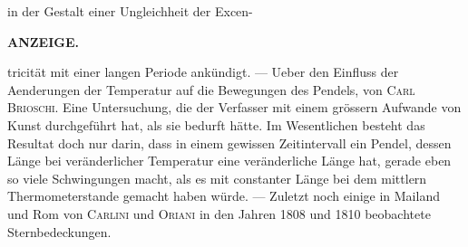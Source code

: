 in der Gestalt einer Ungleichheit der Excen-\par
{}
\clearpage
\thispagestyle{empty}
\noindent{}%
%
\parbox[t]{\dimexpr\linewidth-24mm\relax}{\centering\footnotesize\bfseries ANZEIGE.\par}%
\makebox[12mm][r]{}\par\nobreak\medskip
\noindent tricität mit einer langen Periode ankündigt. --- Ueber den Einfluss der Aenderungen der Temperatur auf die Bewegungen des Pendels, von \textsc{Carl Brioschi}. Eine Untersuchung, die der Verfasser mit einem grössern Aufwande von Kunst durchgeführt hat, als sie bedurft hätte. Im Wesentlichen besteht das Resultat doch nur darin, dass in einem gewissen Zeitintervall ein Pendel, dessen Länge bei veränderlicher Temperatur eine veränderliche Länge hat, gerade eben so viele Schwingungen macht, als es mit constanter Länge bei dem mittlern Thermometerstande gemacht haben würde. --- Zuletzt noch einige in Mailand und Rom von \textsc{Carlini} und \textsc{Oriani} in den Jahren 1808 und 1810 beobachtete Sternbedeckungen.


